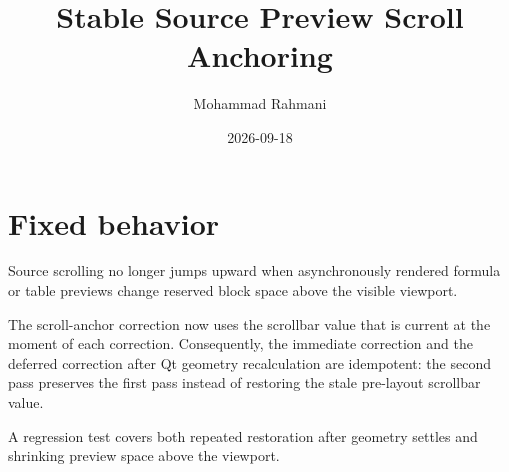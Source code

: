 \documentclass[a4paper]{article}
\title{Stable Source Preview Scroll Anchoring}
\date{2026-09-18}
\author{Mohammad Rahmani}
\begin{document}
   \maketitle

   \section{Fixed behavior}

   Source scrolling no longer jumps upward when asynchronously rendered formula
   or table previews change reserved block space above the visible viewport.

   The scroll-anchor correction now uses the scrollbar value that is current at
   the moment of each correction.  Consequently, the immediate correction and
   the deferred correction after Qt geometry recalculation are idempotent: the
   second pass preserves the first pass instead of restoring the stale pre-layout
   scrollbar value.

   A regression test covers both repeated restoration after geometry settles and
   shrinking preview space above the viewport.

   
   
\end{document}
